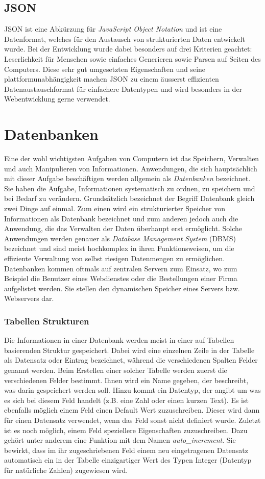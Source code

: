 \documentclass[../main.tex]{subfiles}
\begin{document}
	\subsection{JSON}
	JSON ist eine Abkürzung für \emph{JavaScript Object Notation} und ist eine Datenformat, welches für den Austausch von strukturierten Daten entwickelt wurde. Bei der Entwicklung wurde dabei besonders auf drei Kriterien geachtet: Leserlichkeit für Menschen sowie einfaches Generieren sowie Parsen auf Seiten des Computers. Diese sehr gut umgesetzten Eigenschaften und seine plattformunabhängigkeit  machen JSON zu einem äusserst effizienten Datenaustauschformat für einfachere Datentypen und wird besonders in der Webentwicklung gerne verwendet. \cite{JSON}
	
	\section{Datenbanken} \label{Datenbanken}
	Eine der wohl wichtigsten Aufgaben von Computern ist das Speichern, Verwalten und auch Manipulieren von Informationen. Anwendungen, die sich hauptsächlich mit dieser Aufgabe beschäftigen werden allgemein als \emph{Datenbanken} bezeichnet. Sie haben die Aufgabe, Informationen systematisch zu ordnen, zu speichern und bei Bedarf zu verändern. Grundsätzlich bezeichnet der Begriff Datenbank gleich zwei Dinge auf einmal. Zum einen wird ein strukturierter Speicher von Informationen als Datenbank bezeichnet und zum anderen jedoch auch die Anwendung, die das Verwalten der Daten überhaupt erst ermöglicht. Solche Anwendungen werden genauer als \emph{Database Management System} (DBMS) bezeichnet und sind meist hochkomplex in ihren Funktionsweisen, um die effiziente Verwaltung von selbst riesigen Datenmengen zu ermöglichen. \cite{IT-Handbuch} Datenbanken kommen oftmals auf zentralen Servern zum Einsatz, wo zum Beispiel die Benutzer eines Webdienstes oder die Bestellungen einer Firma aufgelistet werden. Sie stellen den dynamischen Speicher eines Servers bzw. Webservers dar.
	
	\subsubsection*{Tabellen Strukturen}
	Die Informationen in einer Datenbank werden meist in einer auf Tabellen basierenden Struktur gespeichert. Dabei wird eine einzelnen Zeile in der Tabelle als Datensatz oder Eintrag bezeichnet, während die verschiedenen Spalten Felder genannt werden. Beim Erstellen einer solcher Tabelle werden zuerst die verschiedenen Felder bestimmt. Ihnen wird ein Name gegeben, der beschreibt, was darin gespeichert werden soll. Hinzu kommt ein Datentyp, der angibt um was es sich bei diesem Feld handelt (z.B. eine Zahl oder einen kurzen Text). Es ist ebenfalls möglich einem Feld einen Default Wert zuzuschreiben. Dieser wird dann für einen Datensatz verwendet, wenn das Feld sonst nicht definiert wurde. Zuletzt ist es noch möglich, einem Feld speziellere Eigenschaften zuzuschreiben. Dazu gehört unter anderem eine Funktion mit dem Namen \emph{auto\_increment}. Sie bewirkt, dass im ihr zugeschriebenen Feld einem neu eingetragenen Datensatz automatisch ein in der Tabelle einzigartiger Wert des Typen Integer (Datentyp für natürliche Zahlen) zugewiesen wird.
	
\end{document}
